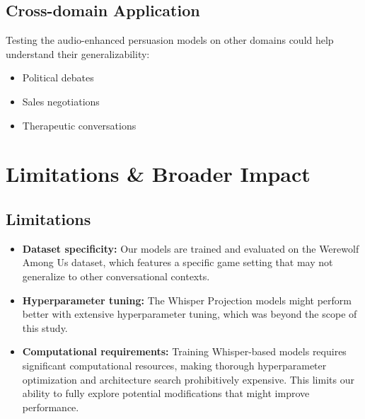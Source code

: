 \documentclass{article}
\begin{document}
\subsection{Cross-domain Application}
Testing the audio-enhanced persuasion models on other domains could help understand their generalizability:
\begin{itemize}
    \item Political debates
    \item Sales negotiations
    \item Therapeutic conversations
\end{itemize}

\section{Limitations \& Broader Impact}
\subsection{Limitations}
\begin{itemize}
    \item \textbf{Dataset specificity:} Our models are trained and evaluated on the Werewolf Among Us dataset, which features a specific game setting that may not generalize to other conversational contexts.
    
    \item \textbf{Hyperparameter tuning:} The Whisper Projection models might perform better with extensive hyperparameter tuning, which was beyond the scope of this study.
    
    \item \textbf{Computational requirements:} Training Whisper-based models requires significant computational resources, making thorough hyperparameter optimization and architecture search prohibitively expensive. This limits our ability to fully explore potential modifications that might improve performance.
\end{itemize}
\end{document}
